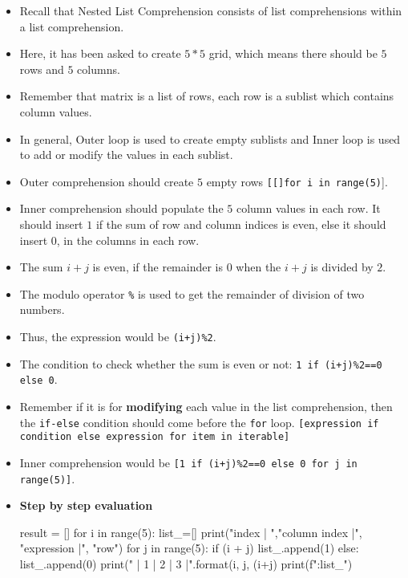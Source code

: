 \documentclass[10pt]{extarticle}
\begin{document}
\begin{itemize}
    \item Recall that Nested List Comprehension consists of list comprehensions within a list comprehension.
    \item Here, it has been asked to create $ 5*5$ grid, which means there should be $5$ rows and $5$ columns. 
    \item Remember that matrix is a list of rows, each row is a sublist which contains column values.
    \item In general, Outer loop is used to create empty sublists and Inner loop is used to add or modify the values in each sublist. 
    \item Outer comprehension should create $5$ empty rows  \colorbox{gray!20}{\texttt{[[]for i in range(5)}]}.
    \item Inner comprehension should populate the $5$ column values in each row. It should insert $1$ if the sum of row and column indices is even, else it 
    should insert $0$, in the columns in each row.
    \item The sum $i + j$ is even, if the remainder is $0$ when the $i + j$  is divided by $2$.
    \item The modulo operator \colorbox{gray!20}{\texttt{\%}} is used to get the remainder of division of two numbers. 
    \item Thus, the expression would be \colorbox{gray!20}{\texttt{(i+j)\%2}}.
    \item The condition to check whether the sum is even or not: \colorbox{gray!20}{\texttt{1 if (i+j)\%2==0 else 0}}.
    \item Remember if it is for \textbf{modifying} each value in the list comprehension, then the \texttt{if-else} condition should come before the \texttt{for} loop. \colorbox{gray!20}{\texttt{[expression if condition else expression for item in iterable]}}  
    \item Inner comprehension would be \colorbox{gray!20}{\texttt{[1 if (i+j)\%2==0 else 0 for j in range(5)]}}.
    \item \textbf{Step by step evaluation} 
    \begin{tcolorbox}[colback=gray!20, colframe=gray!50, sharp corners=southwest]
    \begin{pycode}
result = []
for i in range(5):
  list_=[]
  print("\nrow index | ","column index |", "expression |", "row")
  for j in range(5):
    if (i + j) %
      list_.append(1)
    else:
      list_.append(0)
    print("  |  {1}  |  {2}  |  {3}  |".format(i, j, (i+j)%
  print(f"\nRow:{list_}")    
 

    \end{pycode}
    \end{tcolorbox}
\end{itemize}
\end{document}
